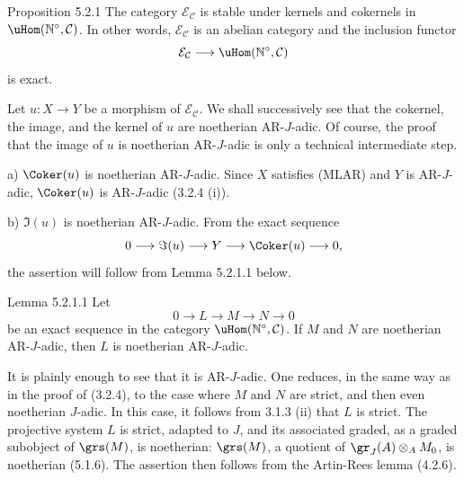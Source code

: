 \begin{statement}{Proposition 5.2.1}
The category \(\mathcal E_{\mathcal C}\) is stable under kernels and cokernels in \(\uHom(\mathbb N^\circ,\mathcal C)\). In other words, \(\mathcal E_{\mathcal C}\) is an abelian category and the inclusion functor
\[
\mathcal E_{\mathcal C}\longrightarrow \uHom(\mathbb N^\circ,\mathcal C)
\]
is exact.
\end{statement}

\begin{prooftext}
Let \(u:X\to Y\) be a morphism of \(\mathcal E_{\mathcal C}\). We shall successively see that the cokernel, the image, and the kernel of \(u\) are noetherian AR-\(J\)-adic. Of course, the proof that the image of \(u\) is noetherian AR-\(J\)-adic is only a technical intermediate step.

a) \(\Coker(u)\) is noetherian AR-\(J\)-adic. Since \(X\) satisfies (MLAR) and \(Y\) is AR-\(J\)-adic, \(\Coker(u)\) is AR-\(J\)-adic (3.2.4 (i)).

b) \(\Im(u)\) is noetherian AR-\(J\)-adic. From the exact sequence
\[
0\longrightarrow \Im(u)\longrightarrow Y\longrightarrow \Coker(u)\longrightarrow 0,
\]
the assertion will follow from Lemma 5.2.1.1 below.
\end{prooftext}

\begin{statement}{Lemma 5.2.1.1}
Let
\[
0\longrightarrow L\longrightarrow M\longrightarrow N\longrightarrow0
\]
be an exact sequence in the category \(\uHom(\mathbb N^\circ,\mathcal C)\). If \(M\) and \(N\) are noetherian AR-\(J\)-adic, then \(L\) is noetherian AR-\(J\)-adic.
\end{statement}

\begin{prooftext}
It is plainly enough to see that it is AR-\(J\)-adic. One reduces, in the same way as in the proof of (3.2.4), to the case where \(M\) and \(N\) are strict, and then even noetherian \(J\)-adic. In this case, it follows from 3.1.3 (ii) that \(L\) is strict. The projective system \(L\) is strict, adapted to \(J\), and its associated graded, as a graded subobject of \(\grs(M)\), is noetherian: \(\grs(M)\), a quotient of \(\gr_J(A)\otimes_A M_0\), is noetherian (5.1.6). The assertion then follows from the Artin-Rees lemma (4.2.6).
\end{prooftext}

